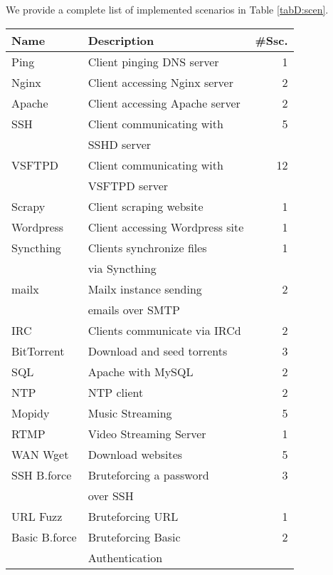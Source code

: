 




We provide a complete list of implemented scenarios in Table \ref{tabD:scen}.

\begin{table}
\begin{tabular}{l|l|r}
 \hline
 Name & Description & \#Ssc. \\
 \hline
 Ping & Client pinging DNS server & 1 \\
 Nginx & Client accessing Nginx server & 2\\
 Apache & Client accessing Apache server & 2\\
 SSH & Client communicating with & 5\\
 &SSHD server&\\
 VSFTPD & Client communicating with & 12\\
 &VSFTPD server&\\
 Scrapy & Client scraping website & 1 \\
 Wordpress & Client accessing Wordpress site & 1\\
 Syncthing& Clients synchronize files & 1\\
 &via Syncthing&\\
 mailx& Mailx instance sending & 2\\
 &emails over SMTP &\\
 IRC & Clients communicate via IRCd& 2\\
 BitTorrent & Download and seed torrents & 3 \\
 SQL & Apache with MySQL & 2\\
 NTP & NTP client & 2\\
 Mopidy & Music Streaming & 5\\
 RTMP & Video Streaming Server & 1\\
 WAN Wget & Download websites & 5 \\
 \hline
 SSH B.force & Bruteforcing a password & 3\\
 &over SSH&\\
 URL Fuzz & Bruteforcing URL & 1\\
 Basic B.force & Bruteforcing Basic & 2\\
 &Authentication&\\

\end{tabular}
\end{table}
